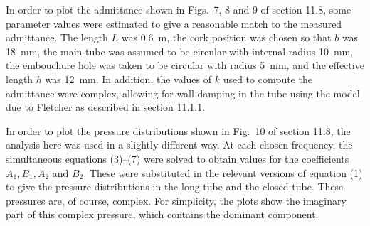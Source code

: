   In order to plot the admittance shown in Figs.\ 7, 8 and 9 of section 11.8, 
  some parameter values were estimated to give a reasonable match to the 
  measured admittance. The length $L$ was 0.6 m, the cork position was chosen 
  so that $b$ was 18 mm, the main tube was assumed to be circular with internal 
  radius 10 mm, the embouchure hole was taken to be circular with radius 5 mm, 
  and the effective length $h$ was 12 mm. In addition, the values of $k$ used 
  to compute the admittance were complex, allowing for wall damping in the tube 
  using the model due to Fletcher as described in section 11.1.1. 

  In order to plot the pressure distributions shown in Fig.\ 10 of section 
  11.8, the analysis here was used in a slightly different way. At each chosen 
  frequency, the simultaneous equations (3)--(7) were solved to obtain values 
  for the coefficients $A_1, B_1, A_2$ and $B_2$. These were substituted in the 
  relevant versions of equation (1) to give the pressure distributions in the 
  long tube and the closed tube. These pressures are, of course, complex. For 
  simplicity, the plots show the imaginary part of this complex pressure, which 
  contains the dominant component. 